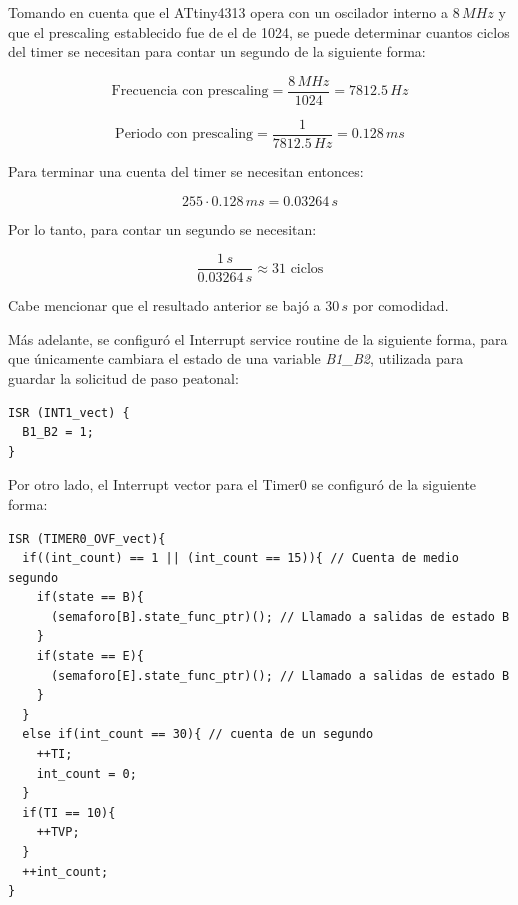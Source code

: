 \newpage

Tomando en cuenta que el ATtiny4313 opera con un oscilador interno a $8\,MHz$ y que el prescaling establecido fue de el de 1024, se puede determinar cuantos ciclos del timer se necesitan para contar un segundo de la siguiente forma:

\begin{equation*}
    \text{Frecuencia con prescaling} = \frac{8\,MHz}{1024} = 7812.5 \,Hz
\end{equation*}

\begin{equation*}
    \text{Periodo con prescaling} = \frac{1}{7812.5 \,Hz} = 0.128\,ms 
\end{equation*}

Para terminar una cuenta del timer se necesitan entonces:

\begin{equation*}
    255 \cdot 0.128\,ms = 0.03264\,s
\end{equation*}

Por lo tanto, para contar un segundo se necesitan:

\begin{equation*}
    \frac{1\,s}{0.03264\,s} \approx \text{31 ciclos}
\end{equation*}

Cabe mencionar que el resultado anterior se bajó a $30\,s$ por comodidad.

Más adelante, se configuró el Interrupt service routine de la siguiente forma, para que únicamente cambiara el estado de una variable \textit{B1\_B2}, utilizada para guardar la solicitud de paso peatonal:

\begin{verbatim}
ISR (INT1_vect) {     
  B1_B2 = 1;
}
\end{verbatim}

Por otro lado, el Interrupt vector para el Timer0 se configuró de la siguiente forma:

\begin{verbatim}
ISR (TIMER0_OVF_vect){
  if((int_count) == 1 || (int_count == 15)){ // Cuenta de medio segundo
    if(state == B){
      (semaforo[B].state_func_ptr)(); // Llamado a salidas de estado B
    }
    if(state == E){
      (semaforo[E].state_func_ptr)(); // Llamado a salidas de estado B
    }
  }
  else if(int_count == 30){ // cuenta de un segundo
    ++TI;
    int_count = 0;
  }
  if(TI == 10){
    ++TVP;
  }
  ++int_count;
}
\end{verbatim}

